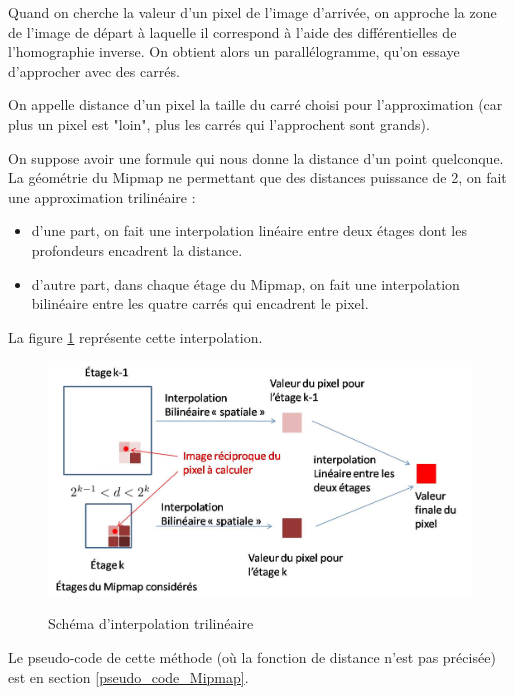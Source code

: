 Quand on cherche la valeur d'un pixel de l'image d'arrivée, on approche la zone de l'image de départ à laquelle il correspond à l'aide des différentielles de l'homographie inverse. On obtient alors un parallélogramme, qu'on essaye d'approcher avec des carrés. %


On appelle distance d'un pixel la taille du carré choisi pour l'approximation (car plus un pixel est "loin", plus les carrés qui l'approchent sont grands). 

On suppose avoir une formule qui nous donne la distance d'un point quelconque. La géométrie du Mipmap ne permettant que des distances puissance de 2, on fait une approximation trilinéaire : 

\begin{itemize}
  \item d'une part, on fait une interpolation linéaire entre deux étages dont les profondeurs encadrent la distance.
  \item d'autre part, dans chaque étage du Mipmap, on fait une interpolation bilinéaire entre les quatre carrés qui encadrent le pixel.
\end{itemize}

La figure \ref{intertrilineaire} représente cette interpolation.

\begin{figure}[h!]
\centering
\caption{Schéma d'interpolation trilinéaire}
\includegraphics[scale=0.5]{intertrilineaire.jpg}
\label{intertrilineaire}
\end{figure}

Le pseudo-code de cette méthode (où la fonction de distance n'est pas précisée) est en section \ref{pseudo_code_Mipmap}.


